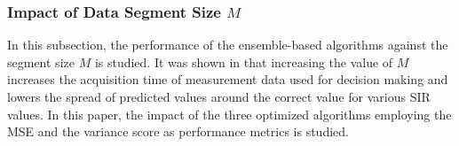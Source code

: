 

\subsubsection{Impact of Data Segment Size $M$}
In this subsection, the performance of the ensemble-based algorithms against the segment size $M$ is studied. It was shown in \cite{Candell_ISIT_2019} that increasing the value of $M$ increases the acquisition time of measurement data used for decision making and lowers the spread of predicted values around the correct value for various SIR values. In this paper, the impact of the three optimized algorithms employing the MSE and the variance score as performance metrics is studied.


